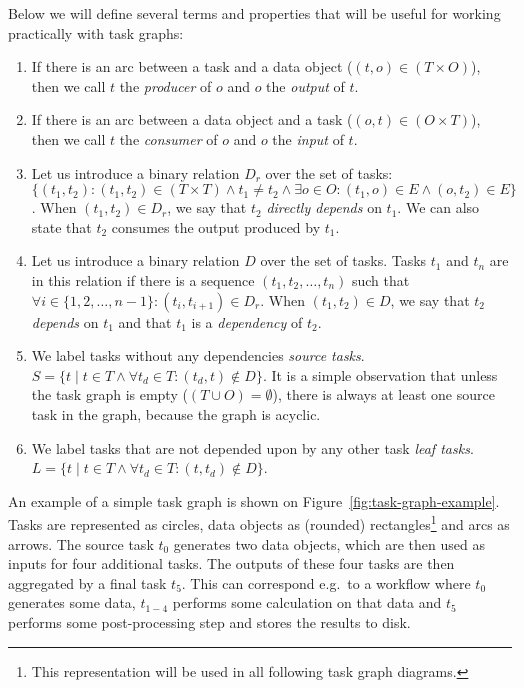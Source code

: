 Below we will define several terms and properties that will be useful for working practically with
task graphs:
\begin{enumerate}
	\item If there is an arc between a task and a data object ($(t,o) \in (T\times{}O)$), then we call
	      $t$ the \emph{producer} of $o$ and $o$
	      the \emph{output} of $t$.
	\item If there is an arc between a data object and a task ($(o,t) \in (O\times{}T)$), then we call
	      $t$ the \emph{consumer} of $o$ and $o$
	      the \emph{input} of $t$.

	\item Let us introduce a binary relation $D_r$ over the set of tasks:
	      $\{(t_1, t_2): (t_1, t_2)\in{}(T\times{}T)\land t_1 \neq t_2 \land
		      \exists{}o\in{}O: (t_1, o)\in{}E
		      \land (o, t_2)\in{}E\}$. When $(t_1, t_2) \in D_r$, we say that $t_2$
	      \emph{directly depends} on $t_1$. We can also state that $t_2$
	      consumes the output produced by $t_1$.

	\item Let us introduce a binary relation $D$ over the set of tasks. Tasks
	      $t_1$ and $t_n$ are in this relation if there is a sequence
	      $(t_1, t_2, \ldots, t_n)$ such that $\forall i \in \{
		      1,2,\ldots,n - 1\}: (t_i, t_{i+1}) \in D_r$. When $(t_1, t_2) \in D$, we say that
	      $t_2$ \emph{depends} on $t_1$ and that
	      $t_1$ is a \emph{dependency} of $t_2$.

	\item We label tasks without any dependencies \emph{source tasks}. $S = \{ t \mid t\in{}T \land \forall{}t_d\in{}T:
		      (t_d, t)\notin D\}$. It is a
	      simple observation that unless the task graph is empty ($(T\cup{}O) = \emptyset$), there is always at
	      least one source task in the graph, because the graph is acyclic.
	\item We label tasks that are not depended upon by any other task \emph{leaf tasks}.
	      $L = \{ t \mid t\in{}T \land \forall{}t_d\in{}T: (t,
		      t_d)\notin D\}$.
\end{enumerate}

An example of a simple task graph is shown on Figure~\ref{fig:task-graph-example}. Tasks are represented
as circles, data objects as (rounded) rectangles\footnote{This representation will be used in all following task graph diagrams.} and arcs as arrows. The
source task $t_0$ generates two data objects, which are then used as inputs for
four additional tasks. The outputs of these four tasks are then aggregated by a final task
$t_5$. This can correspond e.g.\ to a workflow where $t_0$
generates some data, $t_{1-4}$ performs some calculation on that data and
$t_5$ performs some post-processing step and stores the results to disk.

